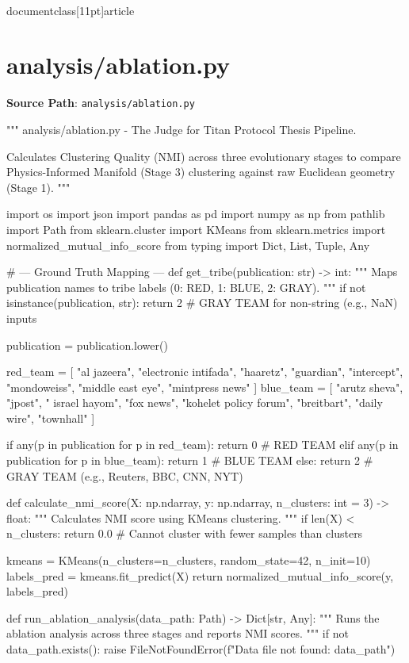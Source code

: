 \\documentclass[11pt]{article}
\begin{document}
\section*{analysis/ablation.py}
\textbf{Source Path}: \texttt{analysis/ablation.py}\par
\bigskip
\begin{CodeBlock}
"""
analysis/ablation.py - The Judge for Titan Protocol Thesis Pipeline.

Calculates Clustering Quality (NMI) across three evolutionary stages to compare
Physics-Informed Manifold (Stage 3) clustering against raw Euclidean geometry (Stage 1).
"""

import os
import json
import pandas as pd
import numpy as np
from pathlib import Path
from sklearn.cluster import KMeans
from sklearn.metrics import normalized_mutual_info_score
from typing import Dict, List, Tuple, Any

# --- Ground Truth Mapping ---
def get_tribe(publication: str) -> int:
    """
    Maps publication names to tribe labels (0: RED, 1: BLUE, 2: GRAY).
    """
    if not isinstance(publication, str):
        return 2 # GRAY TEAM for non-string (e.g., NaN) inputs

    publication = publication.lower()

    red_team = [
        "al jazeera", "electronic intifada", "haaretz", "guardian",
        "intercept", "mondoweiss", "middle east eye", "mintpress news"
    ]
    blue_team = [
        "arutz sheva", "jpost", " israel hayom", "fox news", "kohelet policy forum",
        "breitbart", "daily wire", "townhall"
    ]

    if any(p in publication for p in red_team):
        return 0  # RED TEAM
    elif any(p in publication for p in blue_team):
        return 1  # BLUE TEAM
    else:
        return 2  # GRAY TEAM (e.g., Reuters, BBC, CNN, NYT)

def calculate_nmi_score(X: np.ndarray, y: np.ndarray, n_clusters: int = 3) -> float:
    """
    Calculates NMI score using KMeans clustering.
    """
    if len(X) < n_clusters:
        return 0.0 # Cannot cluster with fewer samples than clusters

    kmeans = KMeans(n_clusters=n_clusters, random_state=42, n_init=10)
    labels_pred = kmeans.fit_predict(X)
    return normalized_mutual_info_score(y, labels_pred)

def run_ablation_analysis(data_path: Path) -> Dict[str, Any]:
    """
    Runs the ablation analysis across three stages and reports NMI scores.
    """
    if not data_path.exists():
        raise FileNotFoundError(f"Data file not found: {data_path}")


\end{CodeBlock}
\end{document}
